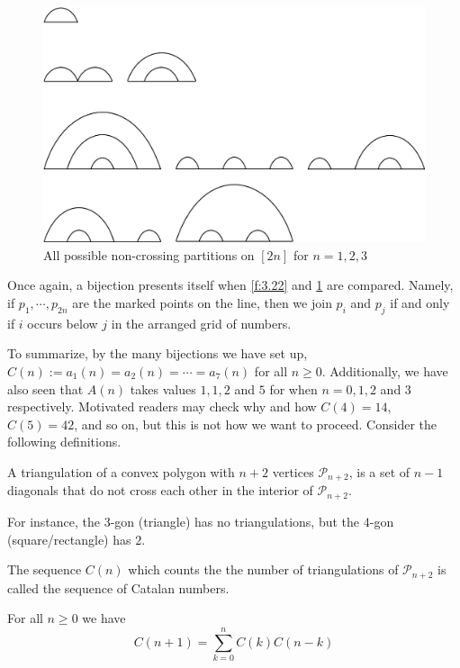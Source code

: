 \begin{solution}
\begin{figure}[H]
    \centering
    \includegraphics[width=0.8\linewidth]{Images/Figure15.png}
    \caption{All possible non-crossing partitions on $[2n]$ for $n=1,2,3$}
    \label{f:3.25}
\end{figure}
Once again, a bijection presents itself when \cref{f:3.22} and \cref{f:3.25} are compared. Namely, if $p_1,\cdots,p_{2n}$ are the marked points on the line, then we join $p_i$ and $p_j$ if and only if $i$ occurs below $j$ in the arranged grid of numbers. 
\end{solution}
To summarize, by the many bijections we have set up, $C(n):=a_1(n)=a_2(n)=\cdots=a_7(n)$ for all $n\geq 0$. Additionally, we have also seen that $A(n)$ takes values $1,1,2$ and $5$ for when $n=0,1,2$ and $3$ respectively. Motivated readers may check why and how $C(4)=14$, $C(5)=42$, and so on, but this is not how we want to proceed. Consider the following definitions.
\begin{definition}[Triangulation]
A triangulation of a convex polygon with $n+2$ vertices $\mathcal{P}_{n+2}$, is a set of $n-1$ diagonals that do not cross each other in the interior of $\mathcal{P}_{n+2}$. 
\end{definition}
\begin{remark}
For instance, the $3$-gon (triangle) has no triangulations, but the $4$-gon (square/rectangle) has $2$.    
\end{remark}
\begin{definition}
The sequence $C(n)$ which counts the the number of triangulations of $\mathcal{P}_{n+2}$ is called the sequence of Catalan numbers.
\label{d:catalan}
\end{definition}
\begin{theorem}
For all $n\geq 0$ we have
\[
C(n+1) = \sum_{k=0}^{n}C(k)C(n-k)
\]
\label{t:segner}
\end{theorem}
